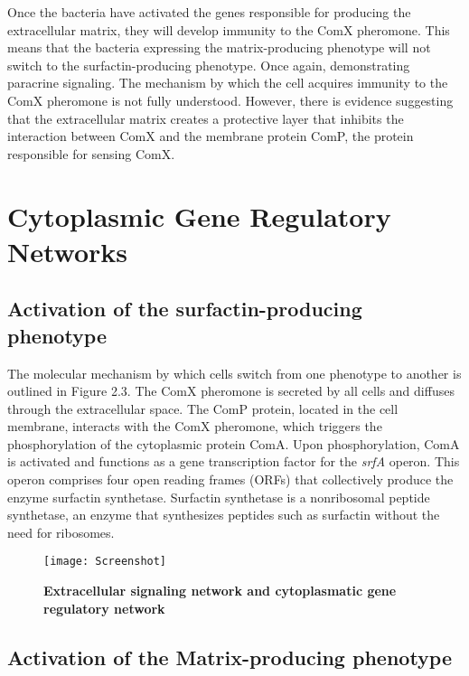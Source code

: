 Once the bacteria have activated the genes responsible for producing the extracellular matrix, they will develop immunity to the ComX pheromone. This means that the bacteria expressing the matrix-producing phenotype will not switch to the surfactin-producing phenotype. Once again, demonstrating paracrine signaling. The mechanism by which the cell acquires immunity to the ComX pheromone is not fully understood. However, there is evidence suggesting that the extracellular matrix creates a protective layer that inhibits the interaction between ComX and the membrane protein ComP, the protein responsible for sensing ComX.{\footnotesize\cite{Lpez2009}}

\section{Cytoplasmic Gene Regulatory Networks}\label{sec:litrev:theme2}

\subsection{Activation of the surfactin-producing phenotype}\label{sec:litrev:theme2}
The molecular mechanism by which cells switch from one phenotype to another is outlined in Figure 2.3. The ComX pheromone is secreted by all cells and diffuses through the extracellular space. The ComP protein, located in the cell membrane, interacts with the ComX pheromone, which triggers the phosphorylation of the cytoplasmic protein ComA. Upon phosphorylation, ComA is activated and functions as a gene transcription factor for the \textit{srfA} operon. This operon comprises four open reading frames (ORFs) that collectively produce the enzyme surfactin synthetase. Surfactin synthetase is a nonribosomal peptide synthetase, an enzyme that synthesizes peptides such as surfactin without the need for ribosomes. {\footnotesize\cite{Lpez2009}\cite{Rahman2021}}


\begin{figure}[h]
    \centering
    \texttt{[image: Screenshot]}
    \caption{\footnotesize \textbf{Extracellular signaling network and cytoplasmatic gene regulatory network} {\footnotesize\cite{Rahman2021}}}



\end{figure}

\subsection{Activation of the Matrix-producing phenotype}\label{sec:litrev:theme2}

